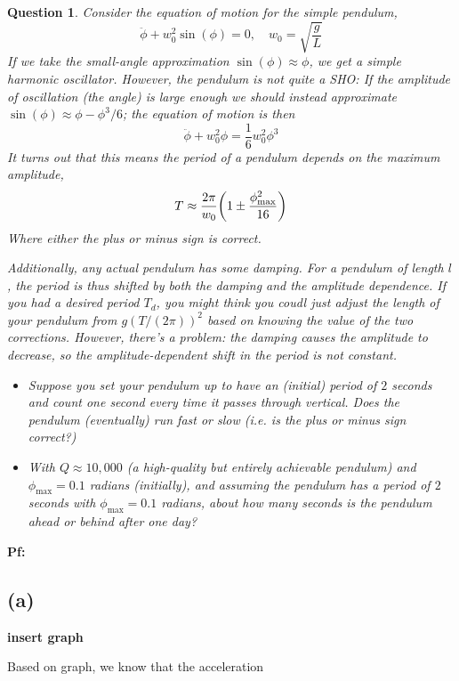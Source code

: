 \documentclass{article}
\newtheorem{question}{Question}
\DeclarePairedDelimiter{\paran}{(}{)}%
\begin{document}
\section{}
\begin{question}\label{q6}
    Consider the equation of motion for the simple pendulum,
    $$\ddot \phi+w_0^2\sin(\phi)=0,\quad w_0=\sqrt{\frac{g}{L}}$$
    If we take the small-angle approximation $\sin(\phi)\approx\phi$, we get a simple harmonic oscillator. However, the pendulum is not quite a SHO: If the amplitude of oscillation (the angle) is large enough we should instead approximate $\sin(\phi)\approx \phi-\phi^3/6$; the equation of motion is then 
    $$\ddot\phi+w_0^2\phi=\frac{1}{6}w_0^2\phi^3$$
    It turns out that this means the period of a pendulum depends on the maximum amplitude,
    $$T\approx\frac{2\pi}{w_0}\paran*{1\pm\frac{\phi^2_{\max}}{16}}$$
    Where either the plus or minus sign is correct.
    
    Additionally, any actual pendulum has some damping. For a pendulum of length $l$, the period is thus shifted by both the damping and the amplitude dependence. If you had a desired period $T_d$, you might think you coudl just adjust the length of your pendulum from $g(T/(2\pi))^2$ based on knowing the value of the two corrections. However, there's a problem: the damping causes the amplitude to decrease, so the amplitude-dependent shift in the period is not constant.
    \begin{itemize}
        \item[(a)] Suppose you set your pendulum up to have an (initial) period of $2$ seconds and count one second every time it passes through vertical. Does the pendulum (eventually) run fast or slow (i.e. is the plus or minus sign correct?) 
        \item[(b)] With $Q\approx 10,000$ (a high-quality but entirely achievable pendulum) and $\phi_{\max}=0.1$ radians (initially), and assuming the pendulum has a period of $2$ seconds with $\phi_{\max}=0.1$ radians, about how many seconds is the pendulum ahead or behind after one day? 
    \end{itemize}
\end{question}

\textbf{Pf:}
\subsection*{(a)}
\textbf{insert graph}

Based on graph, we know that the acceleration
\end{document}
